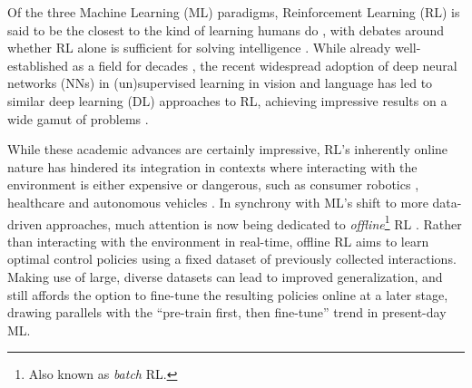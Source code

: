\documentclass[../main.tex]{subfiles}
\begin{document}
Of the three Machine Learning (ML) paradigms, Reinforcement Learning (RL) is said to be the closest
to the kind of learning humans do \citep{sutton_reinforcement_2018}, with debates around whether RL
alone is sufficient for solving intelligence \citep{silver_reward_2021, vamplew_scalar_2022}. While
already well-established as a field for decades \citep{minsky_theory_1954, bellman_dynamic_1957,
klopf_brain_1972, bryson_optimal_1996}, the recent widespread adoption of deep neural networks (NNs)
in (un)supervised learning in vision \citep{krizhevsky_imagenet_2012, he_deep_2016,
mildenhall_nerf_2021} and language \citep{mikolov_distributed_2013, vaswani_attention_2017,
devlin_bert_2019, brown_language_2020} has led to similar deep learning (DL) approaches to RL,
achieving impressive results on a wide gamut of problems \citep{mnih_playing_2013,
silver_general_2018, openai_dota_2019, fawzi_discovering_2022}.

While these academic advances are certainly impressive, RL's inherently online nature has hindered
its integration in contexts where interacting with the environment is either expensive or dangerous,
such as consumer robotics \citep{singh_reinforcement_2022}, healthcare
\citep{liu_reinforcement_2020} and autonomous vehicles \citep{kiran_deep_2022}. In synchrony with
ML's shift to more data-driven approaches, much attention is now being dedicated to
\textit{offline}\footnote{Also known as \textit{batch} RL.} RL \citep{levine_offline_2020,
prudencio_survey_2022}. Rather than interacting with the environment in real-time, offline RL aims
to learn optimal control policies using a fixed dataset of previously collected interactions. Making
use of large, diverse datasets can lead to improved generalization, and still affords the option to
fine-tune the resulting policies online at a later stage, drawing parallels with the ``pre-train
first, then fine-tune'' trend in present-day ML.
\end{document}
